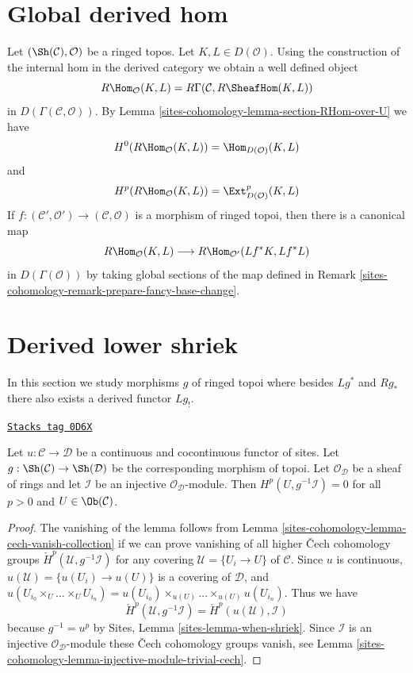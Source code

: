 \section{Global derived hom}
\label{sites-cohomology-section-global-RHom}
Let $(\Sh(\mathcal{C}), \mathcal{O})$ be a ringed topos.
Let $K, L \in D(\mathcal{O})$.
Using the construction of the internal hom in the derived category we
obtain a well defined object
$$
R\Hom_\mathcal{O}(K, L) = R\Gamma(\mathcal{C}, R\SheafHom(K, L))
$$
in $D(\Gamma(\mathcal{C}, \mathcal{O}))$. By
Lemma \ref{sites-cohomology-lemma-section-RHom-over-U} we have
$$
H^0(R\Hom_\mathcal{O}(K, L)) = \Hom_{D(\mathcal{O})}(K, L)
$$
and
$$
H^p(R\Hom_\mathcal{O}(K, L)) = \Ext_{D(\mathcal{O})}^p(K, L)
$$
If $f : (\mathcal{C}', \mathcal{O}') \to (\mathcal{C}, \mathcal{O})$
is a morphism of ringed topoi, then there is a canonical map
$$
R\Hom_\mathcal{O}(K, L) \longrightarrow R\Hom_{\mathcal{O}'}(Lf^*K, Lf^*L)
$$
in $D(\Gamma(\mathcal{O}))$ by taking global sections of the map
defined in Remark \ref{sites-cohomology-remark-prepare-fancy-base-change}.

\section{Derived lower shriek}
\label{sites-cohomology-section-derived-lower-shriek}
In this section we study morphisms $g$ of ringed topoi where besides
$Lg^*$ and $Rg_*$ there also exists a derived functor $Lg_!$.

\begin{lemma}
\label{sites-cohomology-lemma-pullback-injective-pre-limp}
\href{https://stacks.math.columbia.edu/tag/0D6X}{\texttt{Stacks tag 0D6X}}

Let $u : \mathcal{C} \to \mathcal{D}$ be a continuous and cocontinuous
functor of sites. Let $g : \Sh(\mathcal{C}) \to \Sh(\mathcal{D})$
be the corresponding morphism of topoi. Let $\mathcal{O}_\mathcal{D}$
be a sheaf of rings and let $\mathcal{I}$ be an injective
$\mathcal{O}_\mathcal{D}$-module. Then
$H^p(U, g^{-1}\mathcal{I}) = 0$ for all $p > 0$ and $U \in \Ob(\mathcal{C})$.
\end{lemma}

\begin{proof}
The vanishing of the lemma follows from
Lemma \ref{sites-cohomology-lemma-cech-vanish-collection}
if we can prove vanishing of all higher
{\v C}ech cohomology groups
$\check H^p(\mathcal{U}, g^{-1}\mathcal{I})$
for any covering $\mathcal{U} = \{U_i \to U\}$ of $\mathcal{C}$.
Since $u$ is continuous, $u(\mathcal{U}) = \{u(U_i) \to u(U)\}$
is a covering of $\mathcal{D}$, and
$u(U_{i_0} \times_U \ldots \times_U U_{i_n}) =
u(U_{i_0}) \times_{u(U)} \ldots \times_{u(U)} u(U_{i_n})$.
Thus we have
$$
\check H^p(\mathcal{U}, g^{-1}\mathcal{I}) =
\check H^p(u(\mathcal{U}), \mathcal{I})
$$
because $g^{-1} = u^p$ by Sites, Lemma \ref{sites-lemma-when-shriek}.
Since $\mathcal{I}$ is an injective
$\mathcal{O}_\mathcal{D}$-module these {\v C}ech cohomology groups vanish, see
Lemma \ref{sites-cohomology-lemma-injective-module-trivial-cech}.
\end{proof}

